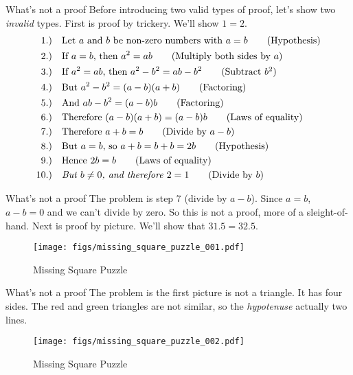 \documentclass{beamer}
\begin{document}
    \begin{frame}{What's not a proof}
        Before introducing two valid types of proof, let's show two \textit{invalid} types.
        First is proof by trickery. We'll show $1=2$.
        \begin{align}
            1.)\quad&
            \text{Let $a$ and $b$ be non-zero numbers with $a=b$}
            \tag{Hypothesis}\\
            2.)\quad
            &\text{If $a=b$, then $a^{2}=ab$}
            \tag{Multiply both sides by $a$}\\
            3.)\quad
            &\text{If $a^{2}=ab$, then $a^{2}-b^{2}=ab-b^{2}$}
            \tag{Subtract $b^{2}$}\\
            4.)\quad
            &\text{But $a^{2}-b^{2}=(a-b)(a+b)$}
            \tag{Factoring}\\
            5.)\quad
            &\text{And $ab-b^{2}=(a-b)b$}
            \tag{Factoring}\\
            6.)\quad
            &\text{Therefore $(a-b)(a+b)=(a-b)b$}
            \tag{Laws of equality}\\
            7.)\quad
            &\text{Therefore $a+b=b$}
            \tag{Divide by $a-b$}\\
            8.)\quad
            &\text{But $a=b$, so $a+b=b+b=2b$}
            \tag{Hypothesis}\\
            9.)\quad
            &\text{Hence $2b=b$}
            \tag{Laws of equality}\\
            10.)\quad
            &\textit{But $b\ne{0}$, and therefore $2=1$}
            \tag{Divide by $b$}
        \end{align}
    \end{frame}
    \begin{frame}{What's not a proof}
        The problem is step 7 (divide by $a-b$). Since $a=b$, $a-b=0$ and we can't divide by zero.
        So this is not a proof, more of a sleight-of-hand. Next is proof by picture. We'll show
        that $31.5=32.5$.
        \begin{figure}
            \centering
            \texttt{[image: figs/missing\_square\_puzzle\_001.pdf]}
            \caption{Missing Square Puzzle}
            \label{fig:missing_square_puzzle_001}
        \end{figure}
    \end{frame}
    \begin{frame}{What's not a proof}
        The problem is the first picture is not a triangle. It has four sides.
        The red and green triangles are not similar, so the \textit{hypotenuse} actually
        two lines.
        \begin{figure}
            \centering
            \texttt{[image: figs/missing\_square\_puzzle\_002.pdf]}
            \caption{Missing Square Puzzle}
            \label{fig:missing_square_puzzle_002}
        \end{figure}
    \end{frame}
\end{document}
